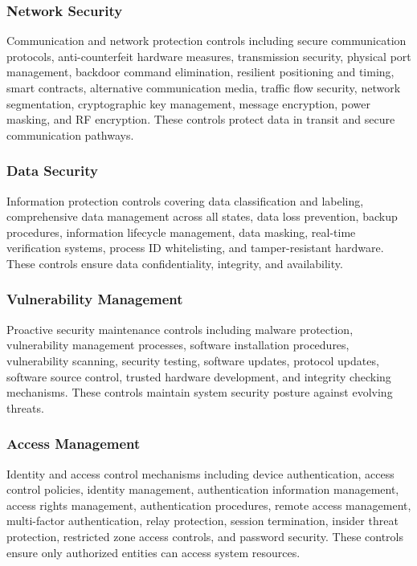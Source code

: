 \documentclass[binding=0.6cm]{sapthesis}
\begin{document}
\subsubsection{Network Security}
Communication and network protection controls including secure communication protocols, anti-counterfeit hardware measures, transmission security, physical port management, backdoor command elimination, resilient positioning and timing, smart contracts, alternative communication media, traffic flow security, network segmentation, cryptographic key management, message encryption, power masking, and RF encryption. These controls protect data in transit and secure communication pathways.

\subsubsection{Data Security}
Information protection controls covering data classification and labeling, comprehensive data management across all states, data loss prevention, backup procedures, information lifecycle management, data masking, real-time verification systems, process ID whitelisting, and tamper-resistant hardware. These controls ensure data confidentiality, integrity, and availability.

\subsubsection{Vulnerability Management}
Proactive security maintenance controls including malware protection, vulnerability management processes, software installation procedures, vulnerability scanning, security testing, software updates, protocol updates, software source control, trusted hardware development, and integrity checking mechanisms. These controls maintain system security posture against evolving threats.

\subsubsection{Access Management}
Identity and access control mechanisms including device authentication, access control policies, identity management, authentication information management, access rights management, authentication procedures, remote access management, multi-factor authentication, relay protection, session termination, insider threat protection, restricted zone access controls, and password security. These controls ensure only authorized entities can access system resources.
\end{document}
